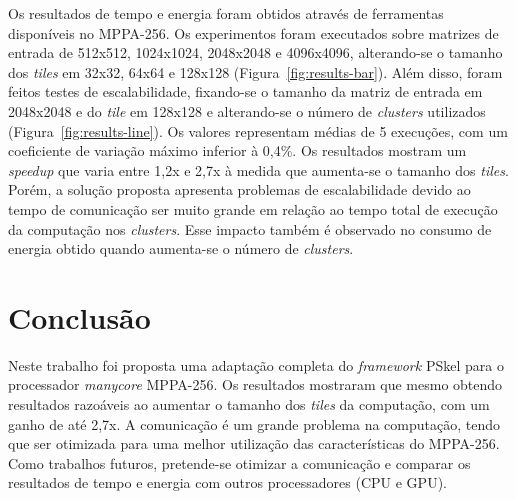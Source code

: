\documentclass[12pt]{article}
\newcommand{\pskel}{\small \textsf{PSkel}\xspace}
\newcommand{\mppa}{\small \textsf{MPPA-256}\xspace}
\begin{document}

Os resultados de tempo e energia foram obtidos através de ferramentas
disponíveis no \mppa. Os experimentos foram executados sobre matrizes de entrada
de 512x512, 1024x1024, 2048x2048 e 4096x4096, alterando-se o tamanho dos
\textit{tiles} em 32x32, 64x64 e 128x128 (Figura~\ref{fig:results-bar}). Além
disso, foram feitos testes de escalabilidade, fixando-se o tamanho da matriz de
entrada em 2048x2048 e do \textit{tile} em 128x128 e alterando-se o número de
\textit{clusters} utilizados (Figura~\ref{fig:results-line}). Os valores
representam médias de 5 execuções, com um coeficiente de variação máximo
inferior à 0,4\%. Os resultados mostram um \textit{speedup} que varia entre 1,2x
e 2,7x à medida que aumenta-se o tamanho dos \textit{tiles}. Porém, a solução
proposta apresenta problemas de escalabilidade devido ao tempo de comunicação
ser muito grande em relação ao tempo total de execução da computação nos
\textit{clusters}. Esse impacto também é observado no consumo de energia obtido
quando aumenta-se o número de \textit{clusters}.

\section{Conclusão}
\label{sec:conclusao}

Neste trabalho foi proposta uma adaptação completa do \textit{framework} \pskel
para o processador \textit{manycore} \mppa. Os resultados mostraram que mesmo
obtendo resultados razoáveis ao aumentar o tamanho dos  \textit{tiles} da
computação, com um ganho de até 2,7x. A comunicação é um grande problema na
computação, tendo que ser otimizada para uma melhor utilização das
características do \mppa. Como trabalhos futuros, pretende-se otimizar a
comunicação e comparar os resultados de tempo e energia com outros processadores
(CPU e GPU).



\end{document}
